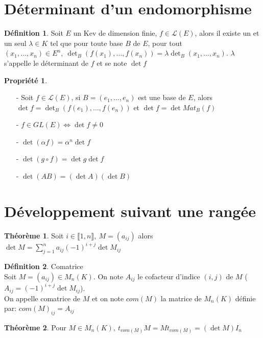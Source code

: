 \documentclass[fleqn]{article}
\theoremstyle{definition} \newtheorem*{defi}{D\'efinition}
\theoremstyle{definition} \newtheorem*{theo}{Th\'eor\`eme}
\theoremstyle{definition} \newtheorem*{coro}{Corollaire}
\theoremstyle{definition} \newtheorem*{nota}{Notation}
\theoremstyle{definition} \newtheorem*{vocab}{Vocabulaire}
\theoremstyle{remark} \newtheorem*{rqs}{Remarques}
\theoremstyle{definition} \newtheorem*{prop}{Propri\'et\'e}
\begin{document}
\section{D\'eterminant d'un endomorphisme}
\begin{defi}
	Soit $E$ un Kev de dimension finie, $f \in \mathscr{L}(E)$, alors il existe un et un seul $\lambda \in K$ tel que pour toute base $B$ de $E$,
	pour tout $(x_1, \hdots, x_n) \in E^n,\ \det_B(f(x_1), \hdots, f(x_n)) = \lambda \det_B(x_1, \hdots, x_n)$. $\lambda$ s'appelle le
	d\'eterminant de $f$ et se note $\det f$
\end{defi}

\begin{prop} $ $
	\begin{enumerate}
		\item [-] Soit $f \in \mathscr{L}(E)$, si $B = (e_1, \hdots, e_n)$ est une base de $E$, alors $\det f = \det_B (f(e_1), \hdots, f(e_n))$
			et $\det f = \det Mat_B (f)$
		\item [-] $f \in GL(E) \Leftrightarrow \det f \neq 0$
		\item [-] $\det (\alpha f) = \alpha^n \det f$
		\item [-] $\det (g \circ f) = \det g \det f$
		\item [-] $\det (AB) = (\det A) (\det B)$
	\end{enumerate}
\end{prop}

\section{D\'eveloppement suivant une rang\'ee}
\begin{theo}
	Soit $i \in \llbracket 1,n \rrbracket ,\ M = (a_{ij})$ alors $\det M = \sum_{j=1}^n a_{ij}(-1)^{i+j} \det M_{ij}$
\end{theo}

\begin{defi} Comatrice \\
	Soit $M = (a_{ij}) \in M_n(K)$. On note $A_{ij}$ le cofacteur d'indice $(i,j)$ de $M$ ($A_{ij} = (-1)^{i+j} \det M_{ij}$). \\
	On appelle comatrice de $M$ et on note $com(M)$ la matrice de $M_n(K)$ d\'efinie par: $com(M)_{ij} = A_{ij}$
\end{defi}

\begin{theo} Pour $M \in M_n(K),\ t_{com(M)} M = M t_{com(M)} = (\det M) I_n$

\end{theo}
\end{document}
